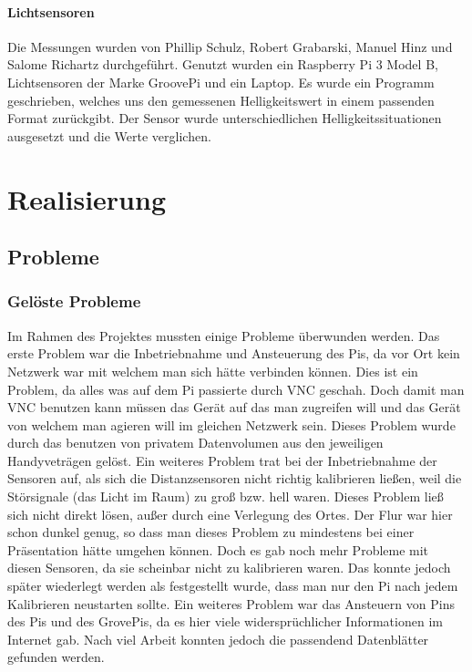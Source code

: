 \documentclass[notitlepage]{report}
\begin{document}
\subsubsection{Lichtsensoren}

Die Messungen wurden von Phillip Schulz, Robert Grabarski, Manuel Hinz und Salome Richartz durchgef\"{u}hrt. Genutzt wurden ein Raspberry Pi 3 Model B, Lichtsensoren der Marke GroovePi und ein Laptop. Es wurde ein Programm geschrieben, welches uns den gemessenen Helligkeitswert in einem passenden Format zur\"{u}ckgibt. Der Sensor wurde unterschiedlichen Helligkeitssituationen ausgesetzt und die Werte verglichen.


\chapter{Realisierung}

\section{Probleme}

\subsection{Gel\"{o}ste Probleme}

Im Rahmen des Projektes mussten einige Probleme überwunden werden. Das erste Problem war die Inbetriebnahme und Ansteuerung des Pis, da vor Ort kein Netzwerk war mit welchem man sich hätte verbinden können. Dies ist ein Problem, da alles was auf dem Pi passierte durch VNC geschah. Doch damit man VNC benutzen kann müssen das Gerät auf das man zugreifen will und das Gerät von welchem man agieren will im gleichen Netzwerk sein. Dieses Problem wurde durch das benutzen von privatem Datenvolumen aus den jeweiligen Handyveträgen gelöst. Ein weiteres Problem trat bei der Inbetriebnahme der Sensoren auf, als sich die Distanzsensoren nicht richtig kalibrieren ließen, weil die Störsignale (das Licht im Raum) zu groß bzw. hell waren. Dieses Problem ließ sich nicht direkt lösen, außer durch eine Verlegung des Ortes. Der Flur war hier schon dunkel genug, so dass man dieses Problem zu mindestens bei einer Präsentation hätte umgehen können. Doch es gab noch mehr Probleme mit diesen Sensoren, da sie scheinbar nicht zu kalibrieren waren. Das konnte jedoch später wiederlegt werden als festgestellt wurde, dass man nur den Pi nach jedem Kalibrieren neustarten sollte. Ein weiteres Problem war das Ansteuern von Pins des Pis und des GrovePis, da es hier viele widersprüchlicher Informationen im Internet gab. Nach viel Arbeit konnten jedoch die passendend Datenblätter gefunden werden. 
\end{document}
